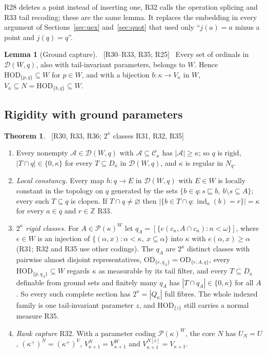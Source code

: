 \documentclass[11pt,letterpaper]{article}
\theoremstyle{definition}
\newtheorem{theorem}[definition]{Theorem}
\newtheorem{lemma}[definition]{Lemma}
\numberwithin{equation}{section}
\newcommand{\HOD}{\mathrm{HOD}}
\newcommand{\OD}{\mathrm{OD}}
\newcommand{\Pow}{\mathcal P}
\newcommand{\ch}{\operatorname{ind}}
\newcommand{\src}[1]{\unskip\ {\normalfont\small\sffamily\color{Olive}[#1]}\ }
\newcommand{\R}[1]{\textsf{R#1}}
\begin{document}
\R{28} deletes a point instead of inserting one, \R{32} calls the operation splicing and \R{33} tail recoding; these are the same lemma. It replaces the embedding in every argument of Sections~\ref{sec:uex} and~\ref{sec:quot} that used only ``$j(a)=a$ minus a point and $j(q)=q$''.

\begin{lemma}[Ground capture]\label{lem:capture}\src{R30--R33, R35; R25}
Every set of ordinals in $\mathcal D(W,q)$, also with tail-invariant parameters, belongs to $W$. Hence $\HOD_{\{p,q\}}\subseteq W$ for $p\in W$, and with a bijection $b:\kappa\to V_\kappa$ in $W$, $V_\kappa\subseteq N=\HOD_{\{b,q\}}\subseteq W$.
\end{lemma}

\subsection{Rigidity with ground parameters}

\begin{theorem}\label{thm:prikryrigid}\src{R30, R33, R36; $2^\kappa$ classes R31, R32, R35}
\begin{enumerate}
\item Every nonempty $\mathcal A\in\mathcal D(W,q)$ with $\mathcal A\subseteq\mathcal C_\kappa$ has $|\mathcal A|\ge\kappa$; so $q$ is rigid, $|T\cap q|\in\{0,\kappa\}$ for every $T\subseteq D_\kappa$ in $\mathcal D(W,q)$, and $\kappa$ is regular in $N_q$.
\item \emph{Local constancy.} Every map $h:q\to E$ in $\mathcal D(W,q)$ with $E\in W$ is locally constant in the topology on $q$ generated by the sets $\{b\in q:s\sqsubseteq b,\ b\setminus s\subseteq A\}$; every such $T\subseteq q$ is clopen. If $T\cap q\ne\varnothing$ then $|\{b\in T\cap q:\ch_a(b)=r\}|=\kappa$ for every $a\in q$ and $r\in\mathbb Z$ \R{33}.
\item \emph{$2^\kappa$ rigid classes.} For $A\in\Pow(\kappa)^W$ let $q_A=[\{e(c_n,A\cap c_n):n<\omega\}]$, where $e\in W$ is an injection of $\{(\alpha,x):\alpha<\kappa,\ x\subseteq\alpha\}$ into $\kappa$ with $e(\alpha,x)\ge\alpha$ (\R{31}; \R{32} and \R{35} use other codings). The $q_A$ are $2^\kappa$ distinct classes with pairwise almost disjoint representatives, $\OD_{\{e,q_A\}}=\OD_{\{e,A,q\}}$, every $\HOD_{\{p,q_A\}}\subseteq W$ regards $\kappa$ as measurable by its tail filter, and every $T\subseteq D_\kappa$ definable from ground sets and finitely many $q_A$ has $|T\cap q_A|\in\{0,\kappa\}$ for all $A$. So every such complete section has $2^\kappa=|Q_\kappa|$ full fibres. The whole indexed family is one tail-invariant parameter $z$, and $\HOD_{\{z\}}$ still carries a normal measure \R{35}.
\item \emph{Rank capture} \R{32}. With a parameter coding $\Pow(\kappa)^W$, the core $N$ has $U_N=U$, $(\kappa^+)^N=(\kappa^+)^V$, $V^N_{\kappa+1}=V^W_{\kappa+1}$ and $V^{N[c]}_{\kappa+1}=V_{\kappa+1}$.
\end{enumerate}
\end{theorem}
\end{document}
